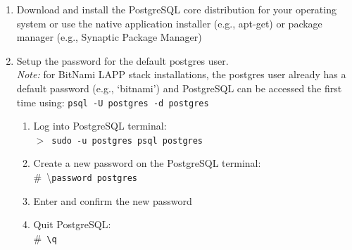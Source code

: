 \begin{enumerate}
    \item Download and install the PostgreSQL core distribution for your 
          operating system\footnotemark 
          or use the native application installer (e.g., apt-get) or package 
          manager (e.g., Synaptic Package Manager)
    \item Setup the password for the default postgres user.\\
          \emph{Note:} for BitNami LAPP stack installations, the postgres user 
          already has a default password (e.g., `bitnami') and PostgreSQL can
          be accessed the first time using: \texttt{psql -U postgres -d 
          postgres}
    \begin{enumerate}
        \item Log into PostgreSQL terminal:\\
              $>$~\texttt{sudo -u postgres psql postgres}
        \item Create a new password on the PostgreSQL terminal:\\ 
              $\#$~\textbackslash \texttt{password postgres}
        \item Enter and confirm the new password
        \item Quit PostgreSQL:\\ 
              $\#$~\texttt{\textbackslash q}
    \end{enumerate} 
\end{enumerate}

